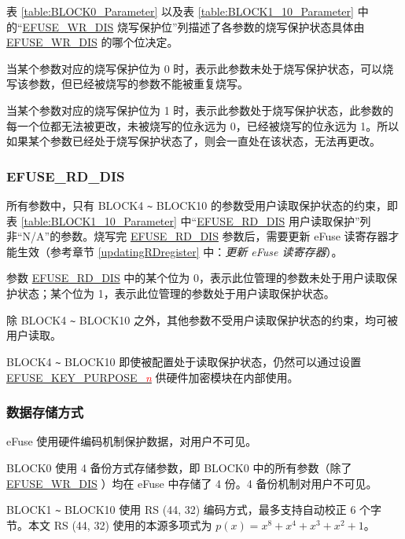 \documentclass[main\_\_CN.tex]{subfiles}
\begin{document}
表 \ref{table:BLOCK0_Parameter} 以及表 \ref{table:BLOCK1_10_Parameter} 中的“\hyperref[fielddesc:EFUSEWRDIS]{EFUSE\_WR\_DIS} 烧写保护位”列描述了各参数的烧写保护状态具体由 \hyperref[fielddesc:EFUSEWRDIS]{EFUSE\_WR\_DIS} 的哪个位决定。

当某个参数对应的烧写保护位为 0 时，表示此参数未处于烧写保护状态，可以烧写该参数，但已经被烧写的参数不能被重复烧写。

当某个参数对应的烧写保护位为 1 时，表示此参数处于烧写保护状态，此参数的每一个位都无法被更改，未被烧写的位永远为 0，已经被烧写的位永远为 1。所以如果某个参数已经处于烧写保护状态了，则会一直处在该状态，无法再更改。

\subsubsection{EFUSE\_RD\_DIS}\label{section:EFUSERDDISABLE}

所有参数中，只有 BLOCK4 \verb+~+ BLOCK10 的参数受用户读取保护状态的约束，即表 \ref{table:BLOCK1_10_Parameter} 中“\hyperref[fielddesc:EFUSERDDIS]{EFUSE\_RD\_DIS} 用户读取保护”列非“N/A”的参数。烧写完 \hyperref[fielddesc:EFUSERDDIS]{EFUSE\_RD\_DIS} 参数后，需要更新 eFuse 读寄存器才能生效（参考章节 \ref{updatingRDregister} 中：\textit{更新 eFuse 读寄存器}）。

参数 \hyperref[fielddesc:EFUSERDDIS]{EFUSE\_RD\_DIS} 中的某个位为 0，表示此位管理的参数未处于用户读取保护状态；某个位为 1，表示此位管理的参数处于用户读取保护状态。

除 BLOCK4 \verb+~+ BLOCK10 之外，其他参数不受用户读取保护状态的约束，均可被用户读取。

BLOCK4 \verb+~+ BLOCK10 即使被配置处于读取保护状态，仍然可以通过设置 \hyperref[fielddesc:EFUSEKEYPURPOSE3]{EFUSE\_KEY\_PURPOSE\_\textcolor{red}{\it{n}}} 供硬件加密模块在内部使用。


\subsubsection{数据存储方式}\label{datastorage}

eFuse 使用硬件编码机制保护数据，对用户不可见。

BLOCK0 使用 4 备份方式存储参数，即 BLOCK0 中的所有参数（除了 \hyperref[fielddesc:EFUSEWRDIS]{EFUSE\_WR\_DIS} ）均在 eFuse 中存储了 4 份。4 备份机制对用户不可见。

BLOCK1 \verb+~+ BLOCK10 使用 RS (44, 32) 编码方式，最多支持自动校正 6 个字节。本文 RS (44, 32) 使用的本源多项式为 \(p(x)=x^8+x^4+x^3+x^2+1\)。
\end{document}
